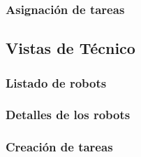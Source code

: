 \subsubsection{Asignación de tareas}

\subsection{Vistas de Técnico}
\subsubsection{Listado de robots}
\subsubsection{Detalles de los robots}
\subsubsection{Creación de tareas}

